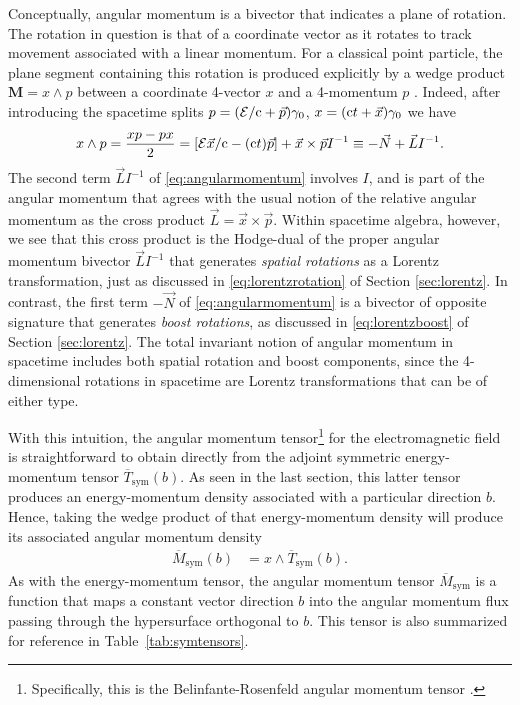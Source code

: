 \documentclass[1p,sort&compress]{elsarticle}
\numberwithin{equation}{section}
\newcommand{\rv}[1]{\vec{#1}}
\newcommand{\bv}[1]{\mathbf{#1}}
\newcommand{\cc}{{\rm c}}
\begin{document}
Conceptually, angular momentum is a bivector that indicates a plane of rotation.  The rotation in question is that of a coordinate vector as it rotates to track movement associated with a linear momentum.  For a classical point particle, the plane segment containing this rotation is produced explicitly by a wedge product $\bv{M} = x\wedge p$ between a coordinate 4-vector $x$ and a 4-momentum $p$ \cite{Landau1975}.  Indeed, after introducing the spacetime splits $p = (\mathcal{E}/\cc + \rv{p})\gamma_0$, $x = (\cc t + \rv{x})\gamma_0$ we have
\begin{align}\label{eq:angularmomentum}
  x\wedge p = \frac{xp - px}{2} = [\mathcal{E}\rv{x}/\cc - (\cc t) \rv{p}] + \rv{x}\times\rv{p} I^{-1} \equiv -\rv{N} + \rv{L}I^{-1}.
\end{align}
The second term $\rv{L}I^{-1}$ of \eqref{eq:angularmomentum} involves $I$, and is part of the angular momentum that agrees with the usual notion of the relative angular momentum as the cross product $\rv{L}=\rv{x}\times\rv{p}$.  Within spacetime algebra, however, we see that this cross product is the Hodge-dual of the proper angular momentum bivector $\rv{L}I^{-1}$ that generates \emph{spatial rotations} as a Lorentz transformation, just as discussed in \eqref{eq:lorentzrotation} of Section \ref{sec:lorentz}.  In contrast, the first term $-\rv{N}$ of \eqref{eq:angularmomentum} is a bivector of opposite signature that generates \emph{boost rotations}, as discussed in \eqref{eq:lorentzboost} of Section \ref{sec:lorentz}.  The total invariant notion of angular momentum in spacetime includes both spatial rotation and boost components, since the 4-dimensional rotations in spacetime are Lorentz transformations that can be of either type.

With this intuition, the angular momentum tensor\footnote{Specifically, this is the Belinfante-Rosenfeld angular momentum tensor \cite{Soper1976,Bliokh2013,Leader2014,Thide2014}.} for the electromagnetic field is straightforward to obtain directly from the adjoint symmetric energy-momentum tensor $\overline{T}_{\text{sym}}(b)$.  As seen in the last section, this latter tensor produces an energy-momentum density associated with a particular direction $b$.  Hence, taking the wedge product of that energy-momentum density will produce its associated angular momentum density
\begin{align}
  \overline{M}_{\text{sym}}(b) &= x\wedge \overline{T}_{\text{sym}}(b).
\end{align}
As with the energy-momentum tensor, the angular momentum tensor $\overline{M}_{\text{sym}}$ is a function that maps a constant vector direction $b$ into the angular momentum flux passing through the hypersurface orthogonal to $b$.  This tensor is also summarized for reference in Table~\ref{tab:symtensors}.
\end{document}
